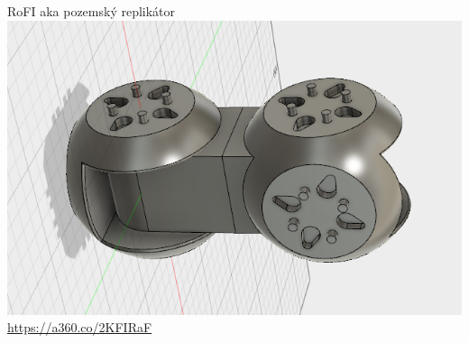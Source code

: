 \documentclass{beamer}
\begin{document}
\begin{frame}{RoFI aka pozemský replikátor}
    \centering
    \includegraphics[width=\textwidth]{img/rofi2}
    \url{https://a360.co/2KFIRaF}
\end{frame}
\end{document}
